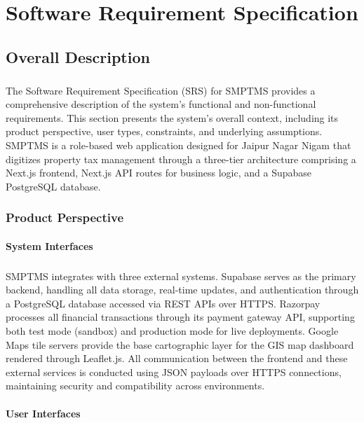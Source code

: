 \chapter{Software Requirement Specification}
\section{Overall Description}
\paragraph{}The Software Requirement Specification (SRS) for SMPTMS provides a comprehensive description of the system's functional and non-functional requirements. This section presents the system's overall context, including its product perspective, user types, constraints, and underlying assumptions. SMPTMS is a role-based web application designed for Jaipur Nagar Nigam that digitizes property tax management through a three-tier architecture comprising a Next.js frontend, Next.js API routes for business logic, and a Supabase PostgreSQL database.

\subsection{Product Perspective}

\subsubsection{System Interfaces}
\paragraph{}SMPTMS integrates with three external systems. Supabase serves as the primary backend, handling all data storage, real-time updates, and authentication through a PostgreSQL database accessed via REST APIs over HTTPS. Razorpay processes all financial transactions through its payment gateway API, supporting both test mode (sandbox) and production mode for live deployments. Google Maps tile servers provide the base cartographic layer for the GIS map dashboard rendered through Leaflet.js. All communication between the frontend and these external services is conducted using JSON payloads over HTTPS connections, maintaining security and compatibility across environments.

\subsubsection{User Interfaces}

